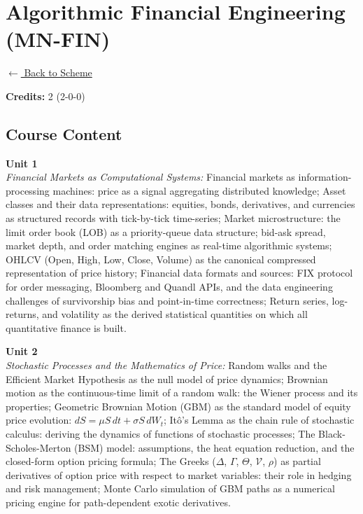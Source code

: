 \section*{Algorithmic Financial Engineering (MN-FIN)}
\label{minor:FIN_L1}

\noindent \small{\hyperref[main:scheme]{$\leftarrow$ Back to Scheme}} \vspace{0.5cm}

\noindent \textbf{Credits:} 2 (2-0-0)

\subsection*{Course Content}
\noindent\textbf{Unit 1} \\
\textit{Financial Markets as Computational Systems:} Financial markets as information-processing machines: price as a signal aggregating distributed knowledge; Asset classes and their data representations: equities, bonds, derivatives, and currencies as structured records with tick-by-tick time-series; Market microstructure: the limit order book (LOB) as a priority-queue data structure; bid-ask spread, market depth, and order matching engines as real-time algorithmic systems; OHLCV (Open, High, Low, Close, Volume) as the canonical compressed representation of price history; Financial data formats and sources: FIX protocol for order messaging, Bloomberg and Quandl APIs, and the data engineering challenges of survivorship bias and point-in-time correctness; Return series, log-returns, and volatility as the derived statistical quantities on which all quantitative finance is built.

\vspace{0.3cm}

\noindent\textbf{Unit 2} \\
\textit{Stochastic Processes and the Mathematics of Price:} Random walks and the Efficient Market Hypothesis as the null model of price dynamics; Brownian motion as the continuous-time limit of a random walk: the Wiener process and its properties; Geometric Brownian Motion (GBM) as the standard model of equity price evolution: $dS = \mu S\, dt + \sigma S\, dW_t$; Itô's Lemma as the chain rule of stochastic calculus: deriving the dynamics of functions of stochastic processes; The Black-Scholes-Merton (BSM) model: assumptions, the heat equation reduction, and the closed-form option pricing formula; The Greeks ($\Delta$, $\Gamma$, $\Theta$, $\mathcal{V}$, $\rho$) as partial derivatives of option price with respect to market variables: their role in hedging and risk management; Monte Carlo simulation of GBM paths as a numerical pricing engine for path-dependent exotic derivatives.

